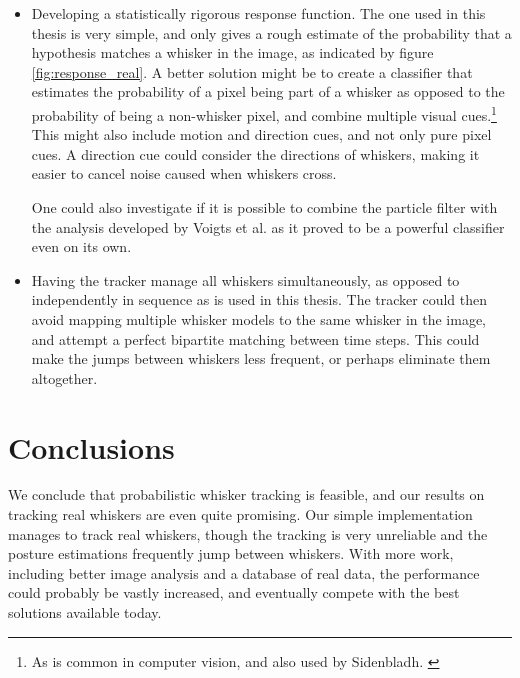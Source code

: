 \begin{itemize}
\item Developing a statistically rigorous response function. The one
  used in this thesis is very simple, and only gives a rough estimate
  of the probability that a hypothesis matches a whisker in the image,
  as indicated by figure \ref{fig:response_real}. A better solution
  might be to create a classifier that estimates the probability of a
  pixel being part of a whisker as opposed to the probability of being
  a non-whisker pixel, and combine multiple visual cues.\footnote{As
    is common in computer vision, and also used by
    Sidenbladh. \cite{Hedvig}} This might also include motion and
  direction cues, and not only pure pixel cues. A direction cue could
  consider the directions of whiskers, making it easier to cancel
  noise caused when whiskers cross.

  One could also investigate if it is possible to combine the particle
  filter with the analysis developed by Voigts et
  al. \cite{UnsupervisedTracking} as it proved to be a powerful
  classifier even on its own.

\item Having the tracker manage all whiskers simultaneously, as
  opposed to independently in sequence as is used in this thesis. The
  tracker could then avoid mapping multiple whisker models to the same
  whisker in the image, and attempt a perfect bipartite matching
  between time steps. This could make the jumps between whiskers less
  frequent, or perhaps eliminate them altogether.

\end{itemize}

\section{Conclusions}

We conclude that probabilistic whisker tracking is feasible, and our
results on tracking real whiskers are even quite promising. Our simple
implementation manages to track real whiskers, though the tracking is
very unreliable and the posture estimations frequently jump between
whiskers. With more work, including better image analysis and a
database of real data, the performance could probably be vastly
increased, and eventually compete with the best solutions available
today.


